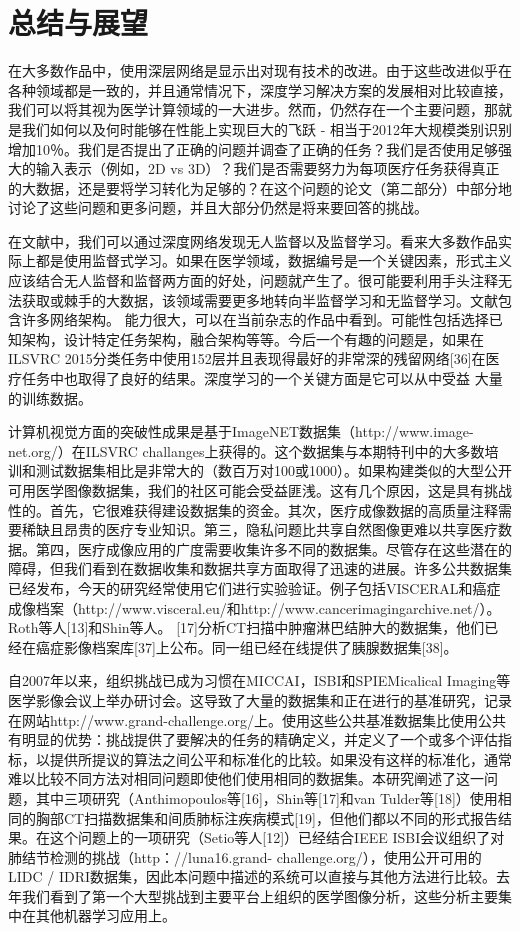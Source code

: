 \chapter{总结与展望}
\label{chap:Sum}

在大多数作品中，使用深层网络是显示出对现有技术的改进。由于这些改进似乎在各种领域都是一致的，并且通常情况下，深度学习解决方案的发展相对比较直接，我们可以将其视为医学计算领域的一大进步。然而，仍然存在一个主要问题，那就是我们如何以及何时能够在性能上实现巨大的飞跃 - 相当于2012年大规模类别识别增加10％。我们是否提出了正确的问题并调查了正确的任务？我们是否使用足够强大的输入表示（例如，2D vs 3D）？我们是否需要努力为每项医疗任务获得真正的大数据，还是要将学习转化为足够的？在这个问题的论文（第二部分）中部分地讨论了这些问题和更多问题，并且大部分仍然是将来要回答的挑战。

在文献中，我们可以通过深度网络发现无人监督以及监督学习。看来大多数作品实际上都是使用监督式学习。如果在医学领域，数据编号是一个关键因素，形式主义应该结合无人监督和监督两方面的好处，问题就产生了。很可能要利用手头注释无法获取或棘手的大数据，该领域需要更多地转向半监督学习和无监督学习。文献包含许多网络架构。 能力很大，可以在当前杂志的作品中看到。可能性包括选择已知架构，设计特定任务架构，融合架构等等。今后一个有趣的问题是，如果在ILSVRC 2015分类任务中使用152层并且表现得最好的非常深的残留网络[36]在医疗任务中也取得了良好的结果。深度学习的一个关键方面是它可以从中受益
大量的训练数据。

计算机视觉方面的突破性成果是基于ImageNET数据集（http://www.image-net.org/）在ILSVRC challanges上获得的。这个数据集与本期特刊中的大多数培训和测试数据集相比是非常大的（数百万对100或1000）。如果构建类似的大型公开可用医学图像数据集，我们的社区可能会受益匪浅。这有几个原因，这是具有挑战性的。首先，它很难获得建设数据集的资金。其次，医疗成像数据的高质量注释需要稀缺且昂贵的医疗专业知识。第三，隐私问题比共享自然图像更难以共享医疗数据。第四，医疗成像应用的广度需要收集许多不同的数据集。尽管存在这些潜在的障碍，但我们看到在数据收集和数据共享方面取得了迅速的进展。许多公共数据集已经发布，今天的研究经常使用它们进行实验验证。例子包括VISCERAL和癌症成像档案（http://www.visceral.eu/和http://www.cancerimagingarchive.net/）。 Roth等人[13]和Shin等人。 [17]分析CT扫描中肿瘤淋巴结肿大的数据集，他们已经在癌症影像档案库[37]上公布。同一组已经在线提供了胰腺数据集[38]。

自2007年以来，组织挑战已成为习惯在MICCAI，ISBI和SPIEMicalical Imaging等医学影像会议上举办研讨会。这导致了大量的数据集和正在进行的基准研究，记录在网站http://www.grand-challenge.org/上。使用这些公共基准数据集比使用公共有明显的优势：挑战提供了要解决的任务的精确定义，并定义了一个或多个评估指标，以提供所提议的算法之间公平和标准化的比较。如果没有这样的标准化，通常难以比较不同方法对相同问题即使他们使用相同的数据集。本研究阐述了这一问题，其中三项研究（Anthimopoulos等[16]，Shin等[17]和van Tulder等[18]）使用相同的胸部CT扫描数据集和间质肺标注疾病模式[19]，但他们都以不同的形式报告结果。在这个问题上的一项研究（Setio等人[12]）已经结合IEEE ISBI会议组织了对肺结节检测的挑战（http：//luna16.grand- challenge.org/），使用公开可用的LIDC / IDRI数据集，因此本问题中描述的系统可以直接与其他方法进行比较。去年我们看到了第一个大型挑战到主要平台上组织的医学图像分析，这些分析主要集中在其他机器学习应用上。 

